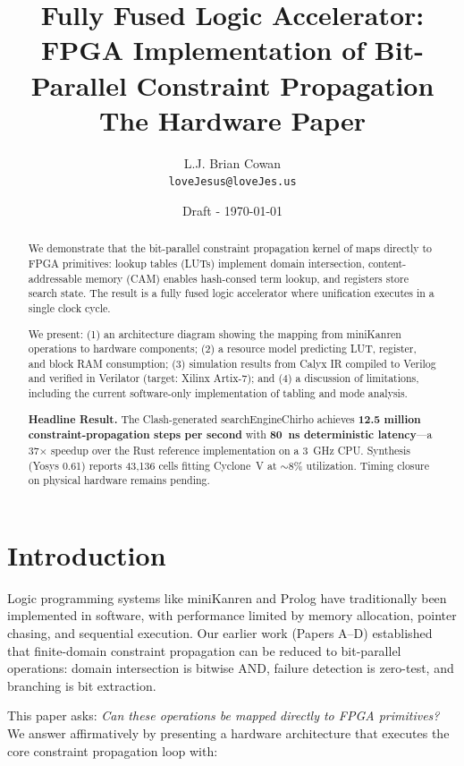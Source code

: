 \documentclass[11pt,a4paper]{article}
\title{Fully Fused Logic Accelerator:\\
FPGA Implementation of Bit-Parallel Constraint Propagation\\
\large The Hardware Paper}
\author{
  L.J. Brian Cowan \\
  \texttt{loveJesus@loveJes.us}
}
\date{Draft - \today}
\begin{document}
\maketitle

\begin{abstract}
We demonstrate that the bit-parallel constraint propagation kernel of
\fdmk{} maps directly to FPGA primitives: lookup tables (LUTs) implement
domain intersection, content-addressable memory (CAM) enables hash-consed
term lookup, and registers store search state. The result is a fully fused
logic accelerator where unification executes in a single clock cycle.

We present: (1) an architecture diagram showing the mapping from miniKanren
operations to hardware components; (2) a resource model predicting LUT,
register, and block RAM consumption; (3) simulation results from Calyx IR
compiled to Verilog and verified in Verilator (target: Xilinx Artix-7); and
(4) a discussion of limitations, including the current software-only
implementation of tabling and mode analysis.

\textbf{Headline Result.}
The Clash-generated searchEngineChirho achieves \textbf{12.5 million
constraint-propagation steps per second} with \textbf{80~ns deterministic
latency}---a 37$\times$ speedup over the Rust reference implementation on
a 3~GHz CPU. Synthesis (Yosys 0.61) reports 43,136 cells fitting Cyclone~V
at $\sim$8\% utilization. Timing closure on physical hardware remains pending.
\end{abstract}

\section{Introduction}
\label{sec:intro_chirho}

\scopeclarification

Logic programming systems like miniKanren and Prolog have traditionally been
implemented in software, with performance limited by memory allocation, pointer
chasing, and sequential execution. Our earlier work (Papers A--D) established
that finite-domain constraint propagation can be reduced to bit-parallel
operations: domain intersection is bitwise AND, failure detection is zero-test,
and branching is bit extraction.

This paper asks: \emph{Can these operations be mapped directly to FPGA
primitives?} We answer affirmatively by presenting a hardware architecture
that executes the core constraint propagation loop with:
\end{document}
